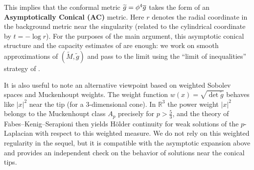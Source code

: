 \begin{corollary}
This implies that the conformal metric $\widetilde{g} = \phi^4 \overline{g}$ takes the form of an \textbf{Asymptotically Conical (AC)} metric. Here $r$ denotes the radial coordinate in the background metric near the singularity (related to the cylindrical coordinate by $t = -\log r$).
For the purposes of the main argument, this asymptotic conical structure and the capacity estimates of  are enough: we work on smooth approximations of $(\widetilde{M},\widetilde{g})$ and pass to the limit using the ``limit of inequalities'' strategy of .

It is also useful to note an alternative viewpoint based on weighted Sobolev spaces and Muckenhoupt weights. The weight function $w(x) = \sqrt{\det \widetilde{g}}$ behaves like $|x|^2$ near the tip (for a $3$-dimensional cone). In $\mathbb{R}^3$ the power weight $|x|^2$ belongs to the Muckenhoupt class $A_p$ precisely for $p>\tfrac{5}{3}$, and the theory of Fabes--Kenig--Serapioni then yields H\"older continuity for weak solutions of the $p$-Laplacian with respect to this weighted measure. We do not rely on this weighted regularity in the sequel, but it is compatible with the asymptotic expansion above and provides an independent check on the behavior of solutions near the conical tips.
\end{corollary}
